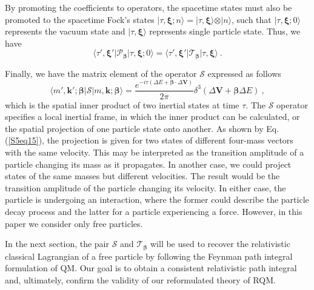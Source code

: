 \documentclass[12pt]{iopart}
\begin{document}
By promoting the coefficients to operators, the spacetime states must also be promoted to the 
spacetime Fock's states $\vert\tau,\boldsymbol{\xi};n\rangle=\vert\tau,\boldsymbol{\xi}\rangle
\otimes\vert n\rangle$, such that $\vert\tau,\boldsymbol{\xi};0\rangle$ represents the vacuum 
state and $\vert\tau,\boldsymbol{\xi}\rangle$ represents single particle state.  Thus, we have
%
    \begin{equation}
        \langle\tau',\boldsymbol{\xi}'\vert\mathcal{P}_{\boldsymbol{\beta}}\vert\tau,\boldsymbol{\xi};0\rangle
        =\langle\tau',\boldsymbol{\xi}'\vert\mathcal{T}_{\boldsymbol{\beta}}\vert\tau,\boldsymbol{\xi}\rangle\ .
        \label{S5eq14}
    \end{equation}
%

Finally, we have the matrix element of the operator $\mathcal{S}$ expressed as follows
%
    \begin{equation}
        \langle m',\boldsymbol{k}';\boldsymbol{\beta}\vert
        \mathcal{S}\vert m,\boldsymbol{k};\boldsymbol{\beta}\rangle=
        \frac{e^{-i\tau(\Delta E+\boldsymbol{\beta}\cdot\Delta\boldsymbol{V})}}
        {2\pi}\delta^3\left(\Delta\boldsymbol{V}+\boldsymbol{\beta}\Delta E\right)\ ,
        \label{S5eq15}
    \end{equation}
%
which is the spatial inner product of two inertial states at time $\tau$.  The $\mathcal{S}$ operator 
specifies a local inertial frame, in which the inner product can be calculated, or the spatial projection 
of one particle state onto another.  As shown by Eq. (\ref{S5eq15}), the projection is given for two 
states of different four-mass vectors with the same velocity.  This may be interpreted as the transition 
amplitude of a particle changing its mass as it propagates.  In another case, we could project states 
of the same masses but different velocities. The result would be the transition amplitude of the particle
changing its velocity.  In either case, the particle is undergoing an interaction, where the former could 
describe the particle decay process and the latter for a particle experiencing a force.  However, in this 
paper we consider only free particles.

In the next section, the pair $\mathcal{S}$ and $\mathcal{T}_{\boldsymbol{\beta}}$ will be 
used to recover the relativistic classical Lagrangian of a free particle by following the Feynman 
path integral formulation of QM.   Our goal is to obtain a consistent relativistic path integral 
and, ultimately, confirm the validity of our reformulated theory of RQM.
%
\end{document}
